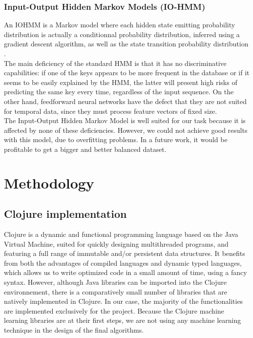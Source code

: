 \documentclass[letterpaper]{article}
\begin{document}
\subsubsection{Input-Output Hidden Markov Models (IO-HMM)}
\label{sssec:iohmm}

An IOHMM is a Markov model where each hidden state emitting probability distribution is actually a conditionnal probability distribution, inferred using a gradient descent algorithm, as well as the state transition probability distribution \citep{YB}. \\

The main deficiency of the standard HMM is that it has no discriminative capabilities: if one of the keys appears to be more frequent in the database or
if it seems to be easily explained by the HMM, the latter will present high risks of predicting the same key every time, regardless of the
input sequence. On the other hand, feedforward neural networks have the defect that they are not suited for temporal data, since they must 
process feature vectors of fixed size. \\

The Input-Output Hidden Markov Model is well suited for our task because it is affected by none of these deficiencies.
However, we could not achieve good results with this model, due to overfitting problems. In a future work, it would be profitable to get a bigger and better balanced dataset.

\section{Methodology}


\subsection{Clojure implementation}

Clojure is a dynamic and functional programming language based on the Java Virtual Machine, suited for quickly designing multithreaded programs,
and featuring a full range of immutable and/or persistent data structures. It benefits from both the advantages of compiled languages and dynamic typed
languages, which allows us to write optimized code in a small amount of time, using a fancy syntax. However, although Java libraries can be imported into the Clojure environnement, there is a comparatively small number of libraries that are natively implemented in Clojure. In our case, the majority of the functionalities
are implemented exclusively for the project. Because the Clojure machine learning libraries are at their first steps, we are not using any machine learning 
technique in the design of the final algorithms.\\
\end{document}
